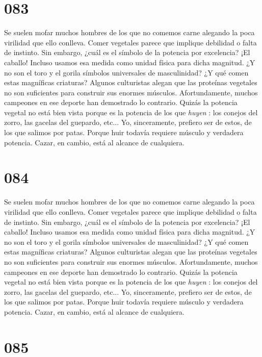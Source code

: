 \documentclass[a4paper,11pt,openright,twocolumn]{book}
\begin{document}
\section*{083}

Se suelen mofar muchos hombres de los que no comemos carne alegando la poca virilidad que ello conlleva.
Comer vegetales parece que implique debilidad o falta de instinto. Sin embargo, ¿cuál es el símbolo de la
potencia por excelencia? ¡El caballo! Incluso usamos esa medida como unidad física para dicha magnitud. 
¿Y no son el toro y el gorila símbolos universales de masculinidad? ¿Y qué comen estas magníficas criaturas?
Algunos culturistas alegan que las proteínas vegetales no son suficientes para construir sus enormes músculos.
Afortundamente, muchos campeones en ese deporte han demostrado lo contrario. Quizás la potencia vegetal
no está bien vista porque es la potencia de los que {\it huyen}  : los conejos del zorro, las gacelas del guepardo, etc...
Yo, sinceramente, prefiero ser de estos, de los que salimos por patas.
Porque huir todavía requiere músculo y verdadera potencia. Cazar, en cambio, está al alcance de cualquiera. 

\section*{084}

Se suelen mofar muchos hombres de los que no comemos carne alegando la poca virilidad que ello conlleva.
Comer vegetales parece que implique debilidad o falta de instinto. Sin embargo, ¿cuál es el símbolo de la
potencia por excelencia? ¡El caballo! Incluso usamos esa medida como unidad física para dicha magnitud. 
¿Y no son el toro y el gorila símbolos universales de masculinidad? ¿Y qué comen estas magníficas criaturas?
Algunos culturistas alegan que las proteínas vegetales no son suficientes para construir sus enormes músculos.
Afortundamente, muchos campeones en ese deporte han demostrado lo contrario. Quizás la potencia vegetal
no está bien vista porque es la potencia de los que {\it huyen}  : los conejos del zorro, las gacelas del guepardo, etc...
Yo, sinceramente, prefiero ser de estos, de los que salimos por patas.
Porque huir todavía requiere músculo y verdadera potencia. Cazar, en cambio, está al alcance de cualquiera. 

\section*{085}
\end{document}
